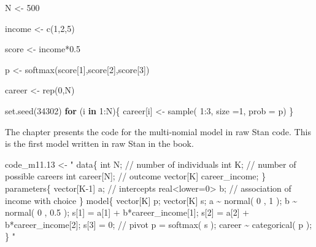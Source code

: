 \documentclass[
]{book}
\newenvironment{Shaded}{\begin{snugshade}}{\end{snugshade}}
\newcommand{\AttributeTok}[1]{\textcolor[rgb]{0.77,0.63,0.00}{#1}}
\newcommand{\ControlFlowTok}[1]{\textcolor[rgb]{0.13,0.29,0.53}{\textbf{#1}}}
\newcommand{\DecValTok}[1]{\textcolor[rgb]{0.00,0.00,0.81}{#1}}
\newcommand{\FloatTok}[1]{\textcolor[rgb]{0.00,0.00,0.81}{#1}}
\newcommand{\FunctionTok}[1]{\textcolor[rgb]{0.00,0.00,0.00}{#1}}
\newcommand{\NormalTok}[1]{#1}
\newcommand{\OtherTok}[1]{\textcolor[rgb]{0.56,0.35,0.01}{#1}}
\newcommand{\SpecialCharTok}[1]{\textcolor[rgb]{0.00,0.00,0.00}{#1}}
\newcommand{\StringTok}[1]{\textcolor[rgb]{0.31,0.60,0.02}{#1}}
\begin{document}
\begin{Shaded}
\begin{Highlighting}[]
\NormalTok{N }\OtherTok{\textless{}{-}} \DecValTok{500}

\NormalTok{income }\OtherTok{\textless{}{-}} \FunctionTok{c}\NormalTok{(}\DecValTok{1}\NormalTok{,}\DecValTok{2}\NormalTok{,}\DecValTok{5}\NormalTok{)}

\NormalTok{score }\OtherTok{\textless{}{-}}\NormalTok{ income}\SpecialCharTok{*}\FloatTok{0.5}

\NormalTok{p }\OtherTok{\textless{}{-}} \FunctionTok{softmax}\NormalTok{(score[}\DecValTok{1}\NormalTok{],score[}\DecValTok{2}\NormalTok{],score[}\DecValTok{3}\NormalTok{])}


\NormalTok{career }\OtherTok{\textless{}{-}} \FunctionTok{rep}\NormalTok{(}\DecValTok{0}\NormalTok{,N)}

\FunctionTok{set.seed}\NormalTok{(}\DecValTok{34302}\NormalTok{)}
\ControlFlowTok{for}\NormalTok{ (i }\ControlFlowTok{in} \DecValTok{1}\SpecialCharTok{:}\NormalTok{N)\{}
\NormalTok{  career[i] }\OtherTok{\textless{}{-}} \FunctionTok{sample}\NormalTok{( }\DecValTok{1}\SpecialCharTok{:}\DecValTok{3}\NormalTok{, }\AttributeTok{size =}\DecValTok{1}\NormalTok{, }\AttributeTok{prob =}\NormalTok{ p)}
\NormalTok{\}}
\end{Highlighting}
\end{Shaded}

The chapter presents the code for the multi-nomial model in raw Stan code. This is the first model written in raw Stan in the book.

\begin{Shaded}
\begin{Highlighting}[]
\NormalTok{code\_m11}\FloatTok{.13} \OtherTok{\textless{}{-}} \StringTok{" data\{}
\StringTok{int N; // number of individuals }
\StringTok{int K; // number of possible careers }
\StringTok{int career[N]; // outcome }
\StringTok{vector[K] career\_income;}
\StringTok{\} }
\StringTok{parameters\{}
\StringTok{vector[K{-}1] a; // intercepts }
\StringTok{real\textless{}lower=0\textgreater{} b; // association of income with choice}
\StringTok{\} }
\StringTok{model\{}
\StringTok{vector[K] p; }
\StringTok{vector[K] s; }
\StringTok{a \textasciitilde{} normal( 0 , 1 ); }
\StringTok{b \textasciitilde{} normal( 0 , 0.5 ); }
\StringTok{s[1] = a[1] + b*career\_income[1]; }
\StringTok{s[2] = a[2] + b*career\_income[2]; }
\StringTok{s[3] = 0; // pivot }
\StringTok{p = softmax( s ); }
\StringTok{career \textasciitilde{} categorical( p );}
\StringTok{\}}
\StringTok{"}
\end{Highlighting}
\end{Shaded}
\end{document}
